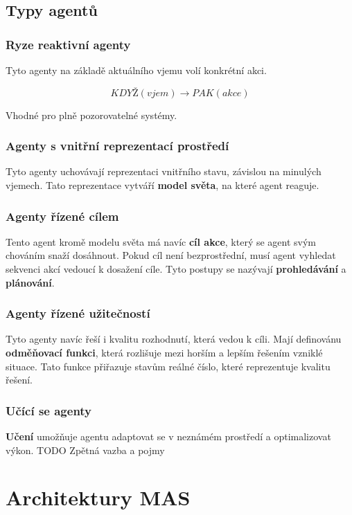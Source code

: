 \subsection{Typy agentů}

\subsubsection{Ryze reaktivní agenty}
Tyto agenty na základě aktuálního vjemu volí konkrétní akci.

$$ KDYŽ(vjem) \rightarrow PAK(akce) $$

Vhodné pro plně pozorovatelné systémy.

\subsubsection{Agenty s vnitřní reprezentací prostředí}
Tyto agenty uchovávají reprezentaci vnitřního stavu, závislou na minulých vjemech. Tato reprezentace vytváří \textbf{model světa}, na které agent reaguje.

\subsubsection{Agenty řízené cílem}
Tento agent kromě modelu světa má navíc \textbf{cíl akce}, který se agent svým chováním snaží dosáhnout. Pokud cíl není bezprostřední, musí agent vyhledat sekvenci akcí vedoucí k dosažení cíle. Tyto postupy se nazývají \textbf{prohledávání} a \textbf{plánování}.

\subsubsection{Agenty řízené užitečností}
Tyto agenty navíc řeší i kvalitu rozhodnutí, která vedou k cíli. Mají definovánu \textbf{odměňovací funkci}, která rozlišuje mezi horším a lepším řešením vzniklé situace. Tato funkce přiřazuje stavům reálné číslo, které reprezentuje kvalitu řešení.

\subsubsection{Učící se agenty}

\textbf{Učení} umožňuje agentu adaptovat se v neznámém prostředí a optimalizovat výkon. TODO Zpětná vazba a pojmy

\section{Architektury MAS}

